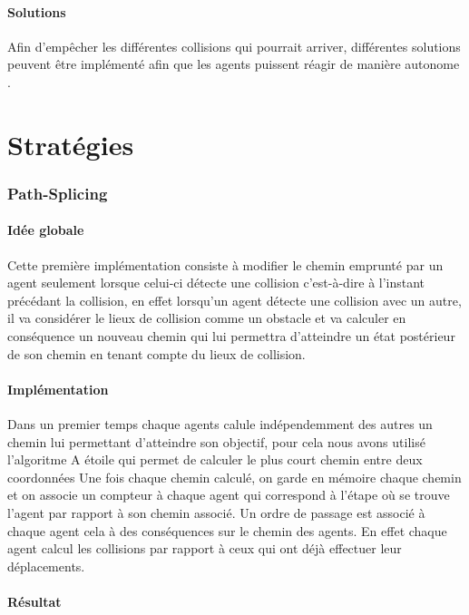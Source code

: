 \documentclass{article}
\begin{document}
			\subsection{Solutions}
				Afin d'empêcher les différentes collisions qui pourrait arriver, différentes solutions peuvent être implémenté afin que les agents puissent réagir de manière autonome .
		
	\part{Stratégies}
	
		\section{Path-Splicing}
		
			\subsection{Idée globale}
			
			Cette première implémentation consiste à modifier le chemin emprunté par un agent seulement lorsque celui-ci détecte une collision c'est-à-dire à l'instant précédant la collision, en effet lorsqu'un agent détecte une collision avec un autre, il va considérer le lieux de collision comme un obstacle et va calculer en conséquence un nouveau chemin qui lui permettra d'atteindre un état postérieur de son chemin en tenant compte du lieux de collision.
			
			\subsection{Implémentation}
			
			Dans un premier temps chaque agents calule indépendemment des autres un chemin lui permettant d'atteindre son objectif, pour cela nous avons utilisé l'algoritme A étoile qui permet de calculer le plus court chemin entre deux coordonnées
			Une fois chaque chemin calculé, on garde en mémoire chaque chemin et on associe un compteur à chaque agent qui correspond à l'étape où se trouve l'agent par rapport à son chemin associé.
			Un ordre de passage est associé à chaque agent cela à des conséquences sur le chemin des agents. En effet chaque agent calcul les collisions par rapport à ceux qui ont déjà effectuer leur déplacements.
			
			\subsection{Résultat}
\end{document}
